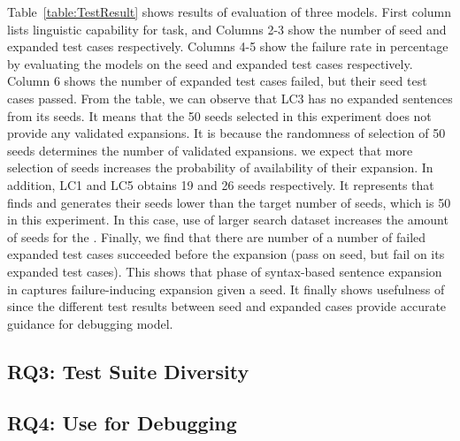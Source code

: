  Table~\ref{table:TestResult} shows
results of evaluation of three \sa models. First column lists
linguistic capability for \sa task, and Columns 2-3 show the number of
seed and expanded test cases respectively. Columns 4-5 show the
failure rate in percentage by evaluating the \sa models on the seed
and expanded test cases respectively. Column 6 shows the number of
expanded test cases failed, but their seed test cases passed.  From
the table, we can observe that LC3 has no expanded sentences from its
seeds. It means that the 50 seeds selected in this experiment does not
provide any validated expansions. It is because the randomness of
selection of 50 seeds determines the number of validated
expansions. we expect that more selection of seeds increases the
probability of availability of their expansion. In addition, LC1 and
LC5 obtains 19 and 26 seeds respectively. It represents that \tool
finds and generates their seeds lower than the target number of seeds,
which is 50 in this experiment. In this case, use of larger search
dataset increases the amount of seeds for the \lcs. Finally, we find
that there are number of a number of failed expanded test cases succeeded
before the expansion (pass on seed, but fail on its expanded test
cases). This shows that phase of syntax-based sentence expansion in
\tool captures failure-inducing expansion given a seed. It finally
shows usefulness of \tool since the different test results between seed
and expanded cases provide accurate guidance for debugging model.


\subsection{RQ3: Test Suite Diversity}


\subsection{RQ4: Use \tool for Debugging}
